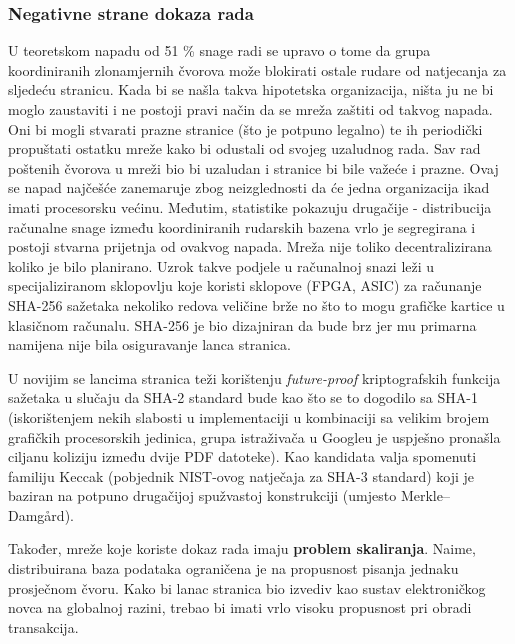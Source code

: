 \documentclass[utf8, zavrsni]{fer}
\begin{document}
\subsubsection{Negativne strane dokaza rada}
U teoretskom napadu \footnotemark od 51 \% snage radi se upravo o tome da grupa koordiniranih zlonamjernih čvorova može blokirati ostale rudare od natjecanja za sljedeću stranicu. Kada bi se našla takva hipotetska organizacija, ništa ju ne bi moglo zaustaviti i ne postoji pravi način da se mreža zaštiti od takvog napada. Oni bi mogli stvarati prazne stranice (što je potpuno legalno) te ih periodički propuštati ostatku mreže kako bi odustali od svojeg uzaludnog rada. Sav rad poštenih čvorova u mreži bio bi uzaludan i stranice bi bile važeće i prazne. Ovaj se napad najčešće zanemaruje zbog neizglednosti da će jedna organizacija ikad imati procesorsku većinu. Međutim, statistike pokazuju drugačije - distribucija računalne snage između koordiniranih rudarskih bazena vrlo je segregirana i postoji stvarna prijetnja od ovakvog napada. Mreža nije toliko decentralizirana koliko je bilo planirano. Uzrok takve podjele u računalnoj snazi leži u specijaliziranom sklopovlju koje koristi sklopove (FPGA, ASIC) za računanje SHA-256 sažetaka nekoliko redova veličine brže no što to mogu grafičke kartice u klasičnom računalu. SHA-256 je bio dizajniran da bude brz jer mu primarna namijena nije bila osiguravanje lanca stranica.

U novijim se lancima stranica teži korištenju \textit{future-proof} kriptografskih funkcija sažetaka u slučaju da SHA-2 standard bude  kao što se to dogodilo sa SHA-1 (iskorištenjem nekih slabosti u implementaciji u kombinaciji sa velikim brojem grafičkih procesorskih jedinica, grupa istraživača u Googleu je uspješno pronašla ciljanu koliziju između dvije PDF datoteke). Kao kandidata valja spomenuti familiju Keccak (pobjednik NIST-ovog natječaja za SHA-3 standard) koji je baziran na potpuno drugačijoj spužvastoj konstrukciji (umjesto Merkle–Damgård).

Također, mreže koje koriste dokaz rada imaju \textbf{problem skaliranja}. Naime, distribuirana baza podataka ograničena je na propusnost pisanja jednaku prosječnom čvoru. Kako bi lanac stranica bio izvediv kao sustav elektroničkog novca na globalnoj razini, trebao bi imati vrlo visoku propusnost pri obradi transakcija.
\end{document}
